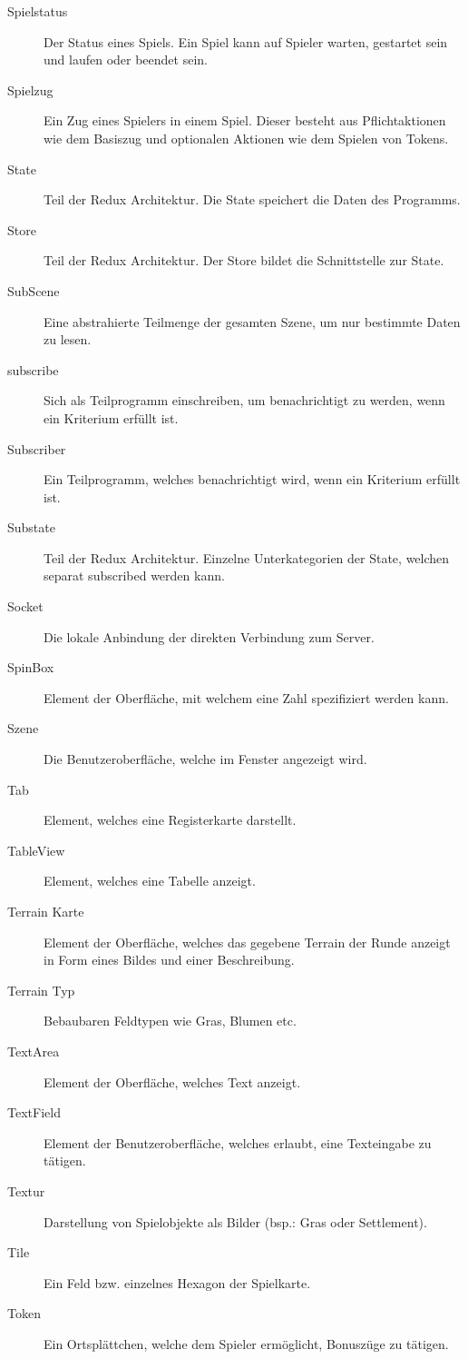 \documentclass[a4paper]{scrreprt}
\begin{document}
\begin{description}
    \item[Spielstatus] Der Status eines Spiels. Ein Spiel kann auf Spieler warten, gestartet sein und laufen oder beendet sein.
    \item[Spielzug] Ein Zug eines Spielers in einem Spiel. Dieser besteht aus Pflichtaktionen wie dem Basiszug und optionalen Aktionen wie dem Spielen von Tokens.
    \item[State] Teil der Redux Architektur. Die State speichert die Daten des Programms.
    \item[Store] Teil der Redux Architektur. Der Store bildet die Schnittstelle zur State.
    \item[SubScene] Eine abstrahierte Teilmenge der gesamten Szene, um nur bestimmte Daten zu lesen.
    \item[subscribe] Sich als Teilprogramm einschreiben, um benachrichtigt zu werden, wenn ein Kriterium erfüllt ist.
    \item[Subscriber] Ein Teilprogramm, welches benachrichtigt wird, wenn ein Kriterium erfüllt ist.
    \item[Substate] Teil der Redux Architektur. Einzelne Unterkategorien der State, welchen separat subscribed werden kann.
	\item[Socket] Die lokale Anbindung der direkten Verbindung zum Server.
	\item[SpinBox] Element der Oberfläche, mit welchem eine Zahl spezifiziert werden kann.
	\item[Szene] Die Benutzeroberfläche, welche im Fenster angezeigt wird.
	\item[Tab] Element, welches eine Registerkarte darstellt.
	\item[TableView] Element, welches eine Tabelle anzeigt.
	\item[Terrain Karte] Element der Oberfläche, welches das gegebene Terrain der Runde anzeigt in Form eines Bildes und einer Beschreibung.
	\item[Terrain Typ] Bebaubaren Feldtypen wie Gras, Blumen etc.
	\item[TextArea] Element der Oberfläche, welches Text anzeigt.
	\item[TextField] Element der Benutzeroberfläche, welches erlaubt, eine Texteingabe zu tätigen.
	\item[Textur] Darstellung von Spielobjekte als Bilder (bsp.: Gras oder Settlement).
	\item[Tile] Ein Feld bzw. einzelnes Hexagon der Spielkarte.
	\item[Token] Ein Ortsplättchen, welche dem Spieler ermöglicht, Bonuszüge zu tätigen.

\end{description}
\end{document}
